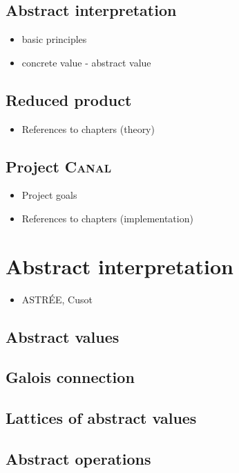 \documentclass[12pt,oneside,draft]{fithesis2}
\begin{document}
\section{Abstract interpretation}
\begin{itemize}
  \item basic principles
  \item concrete value - abstract value
\end{itemize}

\section{Reduced product}
\begin{itemize}
  \item References to chapters (theory)
\end{itemize}

\section{Project \textsc{Canal}}
\begin{itemize}
  \item Project goals
  \item References to chapters (implementation)
\end{itemize}


\chapter{Abstract interpretation}
\begin{itemize}
  \item ASTRÉE, Cusot
\end{itemize}

\section{Abstract values}
\section{Galois connection}
\section{Lattices of abstract values}
\section{Abstract operations}
\end{document}

